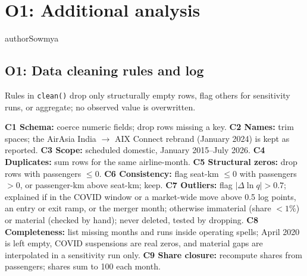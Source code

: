 \clearpage
\section{O1: Additional analysis}
\label{app:o1-additional}
\begin{authorcontribution}{authorSowmya}
\renewcommand{\arraystretch}{1.2}
\subsection{O1: Data cleaning rules and log}
\label{app:o1-cleaning}
Rules in \texttt{clean()} drop only structurally empty rows, flag others for sensitivity runs, or aggregate; no observed value is overwritten.

\textbf{C1 Schema:} coerce numeric fields; drop rows missing a key. \textbf{C2 Names:} trim spaces; the AirAsia India $\to$ AIX Connect rebrand (January 2024) is kept as reported. \textbf{C3 Scope:} scheduled domestic, January 2015--July 2026. \textbf{C4 Duplicates:} sum rows for the same airline-month. \textbf{C5 Structural zeros:} drop rows with passengers $\leq0$. \textbf{C6 Consistency:} flag seat-km $\leq0$ with passengers $>0$, or passenger-km above seat-km; keep. \textbf{C7 Outliers:} flag $|\Delta\ln q|>0.7$; explained if in the COVID window or a market-wide move above 0.5 log points, an entry or exit ramp, or the merger month; otherwise immaterial (share $<1\%$) or material (checked by hand); never deleted, tested by dropping. \textbf{C8 Completeness:} list missing months and runs inside operating spells; April 2020 is left empty, COVID suspensions are real zeros, and material gaps are interpolated in a sensitivity run only. \textbf{C9 Share closure:} recompute shares from passengers; shares sum to 100 each month.


\end{authorcontribution}
